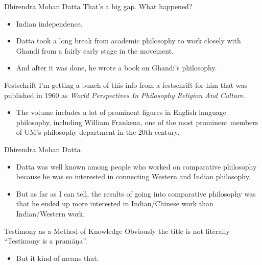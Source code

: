 \documentclass[
  17pt,
  letterpaper,
  ignorenonframetext,
  aspectratio=169,
  handout]{beamer}
\providecommand{\tightlist}{%
  \setlength{\itemsep}{0pt}\setlength{\parskip}{0pt}}\usepackage{longtable,booktabs,array}
\begin{document}
\begin{frame}{Dhirendra Mohan Datta}
\protect\hypertarget{dhirendra-mohan-datta-2}{}
That's a big gap. What happened?

\begin{itemize}[<+->]
\tightlist
\item
  Indian independence.
\item
  Datta took a long break from academic philosophy to work closely with
  Ghandi from a fairly early stage in the movement.
\item
  And after it was done, he wrote a book on Ghandi's philosophy.
\end{itemize}
\end{frame}

\begin{frame}{Festschrift}
\protect\hypertarget{festschrift}{}
I'm getting a bunch of this info from a festschrift for him that was
published in 1960 as \emph{World Perspectives In Philosophy Religion And
Culture}.

\begin{itemize}[<+->]
\tightlist
\item
  The volume includes a lot of prominent figures in English language
  philosophy, including William Frankena, one of the most prominent
  members of UM's philosophy department in the 20th century.
\end{itemize}
\end{frame}

\begin{frame}{Dhirendra Mohan Datta}
\protect\hypertarget{dhirendra-mohan-datta-3}{}
\begin{itemize}[<+->]
\tightlist
\item
  Datta was well known among people who worked on comparative philosophy
  because he was so interested in connecting Western and Indian
  philosophy.
\item
  But as far as I can tell, the results of going into comparative
  philosophy was that he ended up more interested in Indian/Chinese work
  than Indian/Western work.
\end{itemize}
\end{frame}

\begin{frame}{Testimony as a Method of Knowledge}
\protect\hypertarget{testimony-as-a-method-of-knowledge}{}
Obviously the title is not literally ``Testimony is a pramāṇa''.

\begin{itemize}[<+->]
\tightlist
\item
  But it kind of means that.
\end{itemize}
\end{frame}
\end{document}
